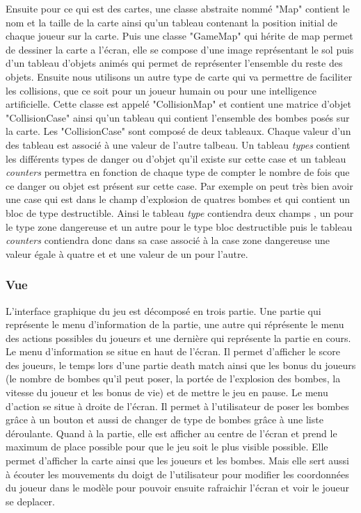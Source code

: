 	Ensuite pour ce qui est des cartes, une classe abstraite nommé "Map" contient le nom et la taille de la carte ainsi qu'un tableau contenant la position initial de chaque joueur sur la carte. Puis une classe "GameMap" qui hérite de map permet de dessiner la carte a l'écran, elle se compose d'une image représentant le sol puis d'un tableau d'objets animés qui permet de représenter l'ensemble du reste des objets. Ensuite nous utilisons un autre type de carte qui va permettre de faciliter les collisions, que ce soit pour un joueur humain ou pour une intelligence artificielle. Cette classe est appelé "CollisionMap" et contient une matrice d'objet "CollisionCase" ainsi qu'un tableau qui contient l'ensemble des bombes posés sur la carte. Les "CollisionCase" sont composé de deux tableaux. Chaque valeur d'un des tableau est associé à une valeur de l'autre talbeau. Un tableau \textit{types} contient les différents types de danger ou d'objet  qu'il existe sur cette case et un tableau \textit{counters} permettra en fonction de chaque type de compter le nombre de fois que ce danger ou objet est présent sur cette case. Par exemple on peut très bien avoir une case qui est dans le champ d'explosion de quatres bombes et qui contient un bloc de type destructible. Ainsi le tableau \textit{type} contiendra deux champs , un pour le type zone dangereuse et un autre pour le type bloc destructible puis le tableau \textit{counters} contiendra donc dans sa case associé à la case zone dangereuse une valeur égale à quatre et et une valeur de un pour l'autre. 
		
	
	\subsubsection{Vue}
	
	L'interface graphique du jeu est décomposé en trois partie. Une partie qui représente le menu d'information de la partie, une autre qui réprésente le menu des actions possibles du joueurs et une dernière qui représente la partie en cours. 
	Le menu d'information se situe en haut de l'écran. Il permet d'afficher le score des joueurs, le temps lors d'une partie death match ainsi que les bonus du joueurs (le nombre de bombes qu'il peut poser, la portée de l'explosion des bombes, la vitesse du joueur et les bonus de vie) et de mettre le jeu en pause.
	Le menu d'action se situe à droite de l'écran. Il permet à l'utilisateur de poser les bombes grâce à un bouton et aussi de changer de type de bombes grâce à une liste déroulante.
	Quand à la partie, elle est afficher au centre de l'écran et prend le maximum de place possible pour que le jeu soit le plus visible possible. Elle permet d'afficher la carte ainsi que les joueurs et les bombes. Mais elle sert aussi à écouter les mouvements du doigt de l'utilisateur pour modifier les coordonnées du joueur dans le modèle pour pouvoir ensuite rafraichir l'écran et voir le joueur se deplacer.
	
